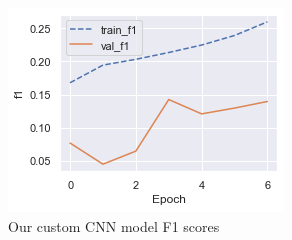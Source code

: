 \documentclass[10pt,twocolumn,letterpaper]{article}
\begin{document}
\begin{figure}[ht]
\begin{center}
   \includegraphics[width=0.8\linewidth]{custom-cnn-f1.png}
\end{center}
\caption{Our custom CNN model F1 scores}
\label{fig:onecol}
\end{figure}
\end{document}
